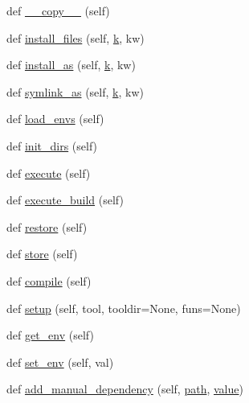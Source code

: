 \begin{DoxyCompactItemize}
\item 
def \hyperlink{classwaflib_1_1_build_1_1_build_context_a4a0f871a711f02e9b65210633a14c6c2}{\+\_\+\+\_\+copy\+\_\+\+\_\+} (self)
\item 
def \hyperlink{classwaflib_1_1_build_1_1_build_context_ae579a92fd181e2d51337b641cb153439}{install\+\_\+files} (self, \hyperlink{rfft2d_test_m_l_8m_adc468c70fb574ebd07287b38d0d0676d}{k}, kw)
\item 
def \hyperlink{classwaflib_1_1_build_1_1_build_context_aba7c5ce03b3cd0d2e8c490d6470a6a9e}{install\+\_\+as} (self, \hyperlink{rfft2d_test_m_l_8m_adc468c70fb574ebd07287b38d0d0676d}{k}, kw)
\item 
def \hyperlink{classwaflib_1_1_build_1_1_build_context_a9b86ee2dd78a51893a2135970f9c6c9c}{symlink\+\_\+as} (self, \hyperlink{rfft2d_test_m_l_8m_adc468c70fb574ebd07287b38d0d0676d}{k}, kw)
\item 
def \hyperlink{classwaflib_1_1_build_1_1_build_context_aeac17c7231c914a04f552b68428f1d0a}{load\+\_\+envs} (self)
\item 
def \hyperlink{classwaflib_1_1_build_1_1_build_context_adb8b13740f058cd0e790340c5f6edf06}{init\+\_\+dirs} (self)
\item 
def \hyperlink{classwaflib_1_1_build_1_1_build_context_a8ef990b5bfdcc98634c6e1248398ecc2}{execute} (self)
\item 
def \hyperlink{classwaflib_1_1_build_1_1_build_context_ab150f731e961183d0acef3aa8c38d345}{execute\+\_\+build} (self)
\item 
def \hyperlink{classwaflib_1_1_build_1_1_build_context_a9222c95f85009e82a95a4a8cbe2df934}{restore} (self)
\item 
def \hyperlink{classwaflib_1_1_build_1_1_build_context_ae39e78bf8a49550451ed42b0467fa9d5}{store} (self)
\item 
def \hyperlink{classwaflib_1_1_build_1_1_build_context_af7d834423f8c49384edaf3dbaa8c912e}{compile} (self)
\item 
def \hyperlink{classwaflib_1_1_build_1_1_build_context_ad26165fd9d32fe212a94936da03066c1}{setup} (self, tool, tooldir=None, funs=None)
\item 
def \hyperlink{classwaflib_1_1_build_1_1_build_context_a39240d22a6d298b74dabc40d8fb193a8}{get\+\_\+env} (self)
\item 
def \hyperlink{classwaflib_1_1_build_1_1_build_context_a8605b754128e554773a5962b55ec0741}{set\+\_\+env} (self, val)
\item 
def \hyperlink{classwaflib_1_1_build_1_1_build_context_aa550cf2655c922455d53077b4f1e4be1}{add\+\_\+manual\+\_\+dependency} (self, \hyperlink{classwaflib_1_1_build_1_1_build_context_afe3db622272692d0069d8b0f66c54a2c}{path}, \hyperlink{lib_2expat_8h_a4a30a13b813682e68c5b689b45c65971}{value})

\end{DoxyCompactItemize}
